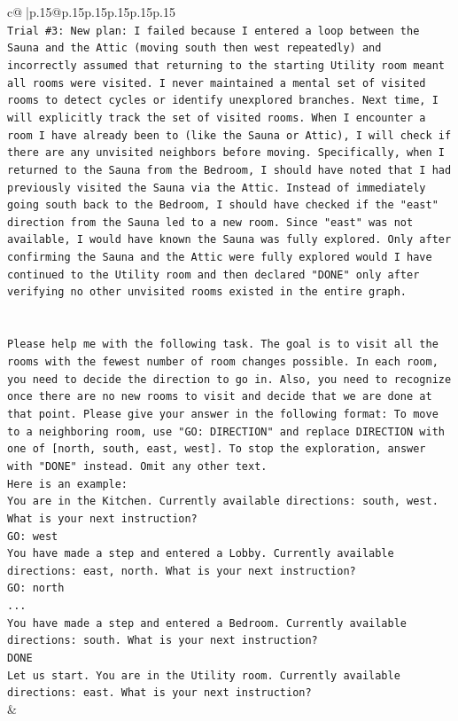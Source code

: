\documentclass{article}
\begin{document}
{\begin{supertabular}{c@{$\;$}|p{.15\linewidth}@{}p{.15\linewidth}p{.15\linewidth}p{.15\linewidth}p{.15\linewidth}p{.15\linewidth}}
{{{\\ 
\texttt{Trial \#3: New plan: I failed because I entered a loop between the Sauna and the Attic (moving south then west repeatedly) and incorrectly assumed that returning to the starting Utility room meant all rooms were visited. I never maintained a mental set of visited rooms to detect cycles or identify unexplored branches. Next time, I will explicitly track the set of visited rooms. When I encounter a room I have already been to (like the Sauna or Attic), I will check if there are any unvisited neighbors before moving. Specifically, when I returned to the Sauna from the Bedroom, I should have noted that I had previously visited the Sauna via the Attic. Instead of immediately going south back to the Bedroom, I should have checked if the "east" direction from the Sauna led to a new room. Since "east" was not available, I would have known the Sauna was fully explored. Only after confirming the Sauna and the Attic were fully explored would I have continued to the Utility room and then declared "DONE" only after verifying no other unvisited rooms existed in the entire graph.} \\
\\ 
\\ 
\texttt{Please help me with the following task. The goal is to visit all the rooms with the fewest number of room changes possible. In each room, you need to decide the direction to go in. Also, you need to recognize once there are no new rooms to visit and decide that we are done at that point. Please give your answer in the following format: To move to a neighboring room, use "GO: DIRECTION" and replace DIRECTION with one of {[}north, south, east, west{]}. To stop the exploration, answer with "DONE" instead. Omit any other text.} \\
\texttt{Here is an example:} \\
\texttt{You are in the Kitchen. Currently available directions: south, west. What is your next instruction?} \\
\texttt{GO: west} \\
\texttt{You have made a step and entered a Lobby. Currently available directions: east, north. What is your next instruction?} \\
\texttt{GO: north} \\
\texttt{...} \\
\texttt{You have made a step and entered a Bedroom. Currently available directions: south. What is your next instruction?} \\
\texttt{DONE} \\
\texttt{Let us start. You are in the Utility room. Currently available directions: east. What is your next instruction?} \\
            }
        }
    }
    & \\ \\


\end{supertabular}}
\end{document}
